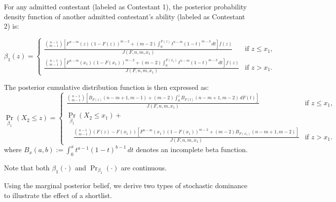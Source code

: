 \begin{corollary}\label{prop:marginalBelief}
For any admitted contestant (labeled as Contestant 1), the posterior probability density function of another admitted contestant's ability (labeled as Contestant 2) is:

\[
\beta_1(z) =   
\begin{cases} 
\frac{\binom{n-1}{m-1}\left [ F^{n-m}(z)(1-F(z))^{m-2}+(m-2)\int_0^{F(z)}t^{n-m}(1-t)^{m-3}\, dt \right ]f(z)}{J(F,n,m,x_1)} & \text{if } z \leq x_1, \\
\frac{\binom{n-1}{m-1}\left [  F^{n-m}(x_1)(1-F(x_1))^{m-2} +(m-2)\int_0^{F(x_1)} t^{n-m}(1-t)^{m-3}\, dt \right ] f(z)}{J(F,n,m,x_1)} & \text{if } z > x_1.
\end{cases}
\]

The posterior cumulative distribution function is then expressed as:
\[
\Pr_{\beta_1}(X_2\leq z) =   
\begin{cases} 
\frac{\binom{n-1}{m-1} \left [ B_{F(z)}(n-m+1,m-1) + (m-2)\int_{0}^{z} B_{F(t)}(n-m+1, m-2) \, dF(t) \right ]}{J(F,n,m,x_1)} & \text{if } z \leq x_1, \\
\Pr_{\beta_1}(X_2\leq x_1) + \\ \quad\frac{\binom{n-1}{m-1}(F(z)-F(x_1))\left [ F^{n-m}(x_1)(1-F(x_1))^{m-2}+(m-2)B_{F(x_1)}(n-m+1, m-2)\right ]}{J(F,n,m,x_1)} & \text{if } z > x_1.
\end{cases}
\]
where $B_{x}(a,b):=\int_{0}^{x} t^{a-1}(1-t)^{b-1} \, dt$ denotes an incomplete beta function.

Note that both $\beta_1(\cdot)$ and $\Pr_{\beta_1}(\cdot)$ are continuous.
\end{corollary}

Using the marginal posterior belief, we derive two types of stochastic dominance to illustrate the effect of a shortlist.

